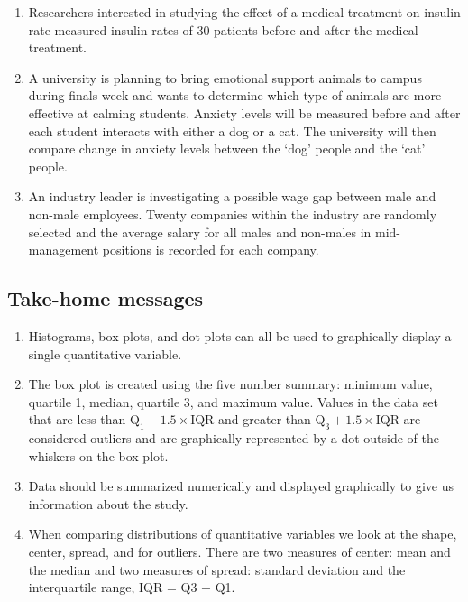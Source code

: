\documentclass[
]{report}
\begin{document}
\begin{enumerate}
\def\labelenumi{\arabic{enumi}.}
\item
  Researchers interested in studying the effect of a medical treatment on insulin rate measured insulin rates of 30 patients before and after the medical treatment.
  \vspace{0.3in}
\item
  A university is planning to bring emotional support animals to campus during finals week and wants to determine which type of animals are more effective at calming students. Anxiety levels will be measured before and after each student interacts with either a dog or a cat. The university will then compare change in anxiety levels between the `dog' people and the `cat' people.
  \vspace{0.3in}
\item
  An industry leader is investigating a possible wage gap between male and non-male employees. Twenty companies within the industry are randomly selected and the average salary for all males and non-males in mid-management positions is recorded for each company.
  \vspace{0.3in}
\end{enumerate}

\subsection{Take-home messages}\label{take-home-messages}

\begin{enumerate}
\def\labelenumi{\arabic{enumi}.}
\item
  Histograms, box plots, and dot plots can all be used to graphically display a single quantitative variable.
\item
  The box plot is created using the five number summary: minimum value, quartile 1, median, quartile 3, and maximum value. Values in the data set that are less than \(\text{Q}_1 - 1.5\times \text{IQR}\) and greater than \(\text{Q}_3 + 1.5\times \text{IQR}\) are considered outliers and are graphically represented by a dot outside of the whiskers on the box plot.
\item
  Data should be summarized numerically and displayed graphically to give us information about the study.
\item
  When comparing distributions of quantitative variables we look at the shape, center, spread, and for outliers. There are two measures of center: mean and the median and two measures of spread: standard deviation and the interquartile range, IQR = Q3 \(-\) Q1.
\end{enumerate}
\end{document}
